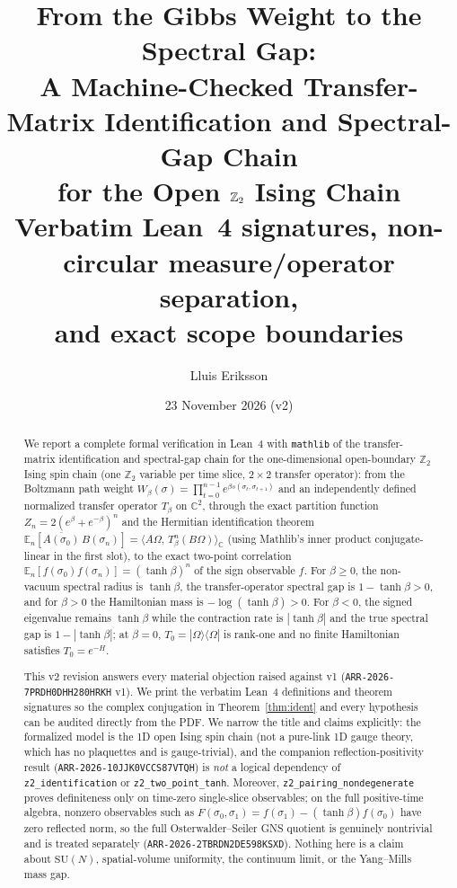 \documentclass[11pt]{article}
\title{From the Gibbs Weight to the Spectral Gap:\\
A Machine-Checked Transfer-Matrix Identification and Spectral-Gap Chain\\
for the Open $\Z_2$ Ising Chain\\
\large Verbatim Lean~4 signatures, non-circular measure/operator separation,\\
and exact scope boundaries}
\author{Lluis Eriksson}
\date{23 November 2026 (v2)}
\theoremstyle{remark}
\theoremstyle{definition}
\newcommand{\lean}[1]{\texttt{#1}}
\newcommand{\C}{\mathbb{C}}
\newcommand{\Z}{\mathbb{Z}}
\newcommand{\SU}{\mathrm{SU}}
\newcommand{\Om}{\Omega}
\newcommand{\inn}[2]{\langle #1,\, #2\rangle_{\C}}
\newcommand{\Ex}{\mathbb{E}}
\newcommand{\ket}[1]{|#1\rangle}
\newcommand{\bra}[1]{\langle #1|}
\begin{document}
\maketitle

\begin{abstract}
We report a complete formal verification in Lean~4 with \texttt{mathlib} of the
transfer-matrix identification and spectral-gap chain for the one-dimensional
open-boundary $\Z_2$ Ising spin chain (one $\Z_2$ variable per time slice, $2\times 2$
transfer operator): from the Boltzmann path weight
$W_\beta(\sigma)=\prod_{t=0}^{n-1} e^{\beta s(\sigma_t,\sigma_{t+1})}$ and an
independently defined normalized transfer operator $T_\beta$ on $\C^2$, through the
exact partition function $Z_n = 2(e^\beta+e^{-\beta})^n$ and the Hermitian identification
theorem $\Ex_n[\overline{A(\sigma_0)}\,B(\sigma_n)] = \inn{A\Om}{T_\beta^n (B\Om)}$
(using Mathlib's inner product conjugate-linear in the first slot), to the exact two-point
correlation $\Ex_n[f(\sigma_0)f(\sigma_n)] = (\tanh\beta)^n$ of the sign observable $f$.
For $\beta \ge 0$, the non-vacuum spectral radius is $\tanh\beta$, the transfer-operator
spectral gap is $1 - \tanh\beta > 0$, and for $\beta > 0$ the Hamiltonian mass is
$-\log(\tanh\beta) > 0$. For $\beta < 0$, the signed eigenvalue remains $\tanh\beta$
while the contraction rate is $|\tanh\beta|$ and the true spectral gap is $1 - |\tanh\beta|$;
at $\beta = 0$, $T_0 = \ket{\Om}\bra{\Om}$ is rank-one and no finite Hamiltonian satisfies
$T_0 = e^{-H}$.

This v2 revision answers every material objection raised against v1
(\texttt{ARR-2026-7PRDH0DHH280HRKH} v1). We print the verbatim Lean~4 definitions and
theorem signatures so the complex conjugation in Theorem~\ref{thm:ident} and every
hypothesis can be audited directly from the PDF. We narrow the title and claims explicitly:
the formalized model is the 1D open Ising spin chain (not a pure-link 1D gauge theory,
which has no plaquettes and is gauge-trivial), and the companion reflection-positivity
result (\texttt{ARR-2026-10JJK0VCCS87VTQH}) is \emph{not} a logical dependency of
\lean{z2\_identification} or \lean{z2\_two\_point\_tanh}. Moreover,
\lean{z2\_pairing\_nondegenerate} proves definiteness only on time-zero single-slice
observables; on the full positive-time algebra, nonzero observables such as
$F(\sigma_0,\sigma_1) = f(\sigma_1) - (\tanh\beta)f(\sigma_0)$ have zero reflected norm,
so the full Osterwalder--Seiler GNS quotient is genuinely nontrivial and is treated
separately (\texttt{ARR-2026-2TBRDN2DE598KSXD}). Nothing here is a claim about $\SU(N)$,
spatial-volume uniformity, the continuum limit, or the Yang--Mills mass gap.
\end{abstract}
\end{document}
